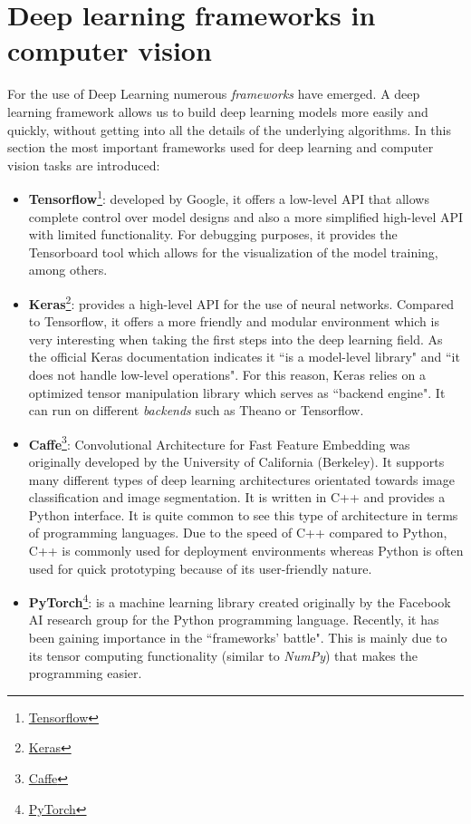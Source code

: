 \section{Deep learning frameworks in computer vision}
For the use of Deep Learning numerous \textit{frameworks} have emerged. A deep learning framework allows us to build deep learning models more easily and quickly, without getting into all the details of the underlying algorithms. In this section the most important frameworks used for deep learning and computer vision tasks are introduced:
\begin{itemize}
\item \textbf{Tensorflow}\footnote {\href{https://www.tensorflow.org/}{Tensorflow}}: developed by Google, it offers a low-level API that allows complete control over model designs and also a more simplified high-level API with limited functionality. For debugging purposes, it provides the Tensorboard tool which allows for the visualization of the model training, among others.
\item \textbf{Keras}\footnote {\href{https://keras.io/}{Keras}}: provides a high-level API for the use of neural networks. Compared to Tensorflow, it offers a more friendly and modular environment which is very interesting when taking the first steps into the deep learning field. As the official Keras documentation indicates it ``is a model-level library" and ``it does not handle low-level operations". For this reason, Keras relies on a optimized tensor manipulation library which serves as ``backend engine". It can run on different \textit{backends} such as Theano or Tensorflow.
\item \textbf{Caffe}\footnote {\href{https://caffe.berkeleyvision.org/}{Caffe}}: Convolutional Architecture for Fast Feature Embedding was originally developed by the University of California (Berkeley). It supports many different types of deep learning architectures orientated towards image classification and image segmentation. It is written in C++ and provides a Python interface. It is quite common to see this type of architecture in terms of programming languages. Due to the speed of C++ compared to Python, C++ is commonly used for deployment environments whereas Python is often used for quick prototyping because of its user-friendly nature.
\item \textbf{PyTorch}\footnote {\href{https://pytorch.org/}{PyTorch}}: is a machine learning library created originally by the Facebook AI research group for the Python programming language. Recently, it has been gaining importance in the ``frameworks' battle". This is mainly due to its tensor computing functionality (similar to \textit{NumPy}) that makes the programming easier.
\end{itemize}
